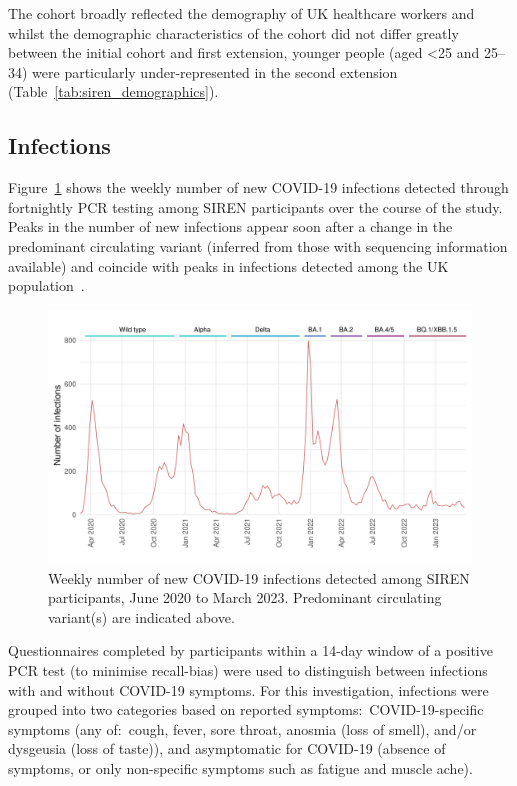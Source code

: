 The cohort broadly reflected the demography of UK healthcare workers and whilst the demographic characteristics of the cohort did not differ greatly between the initial cohort and first extension, younger people (aged <25 and 25--34) were particularly under-represented in the second extension (Table~\ref{tab:siren_demographics}).

\subsection{Infections}

Figure~\ref{fig:sireninfections} shows the weekly number of new COVID-19 infections detected through fortnightly PCR testing among SIREN participants over the course of the study. Peaks in the number of new infections appear soon after a change in the predominant circulating variant (inferred from those with sequencing information available) and coincide with peaks in infections detected among the UK population~\parencite{UK_Government2021-ip}.

\begin{figure}[htbp!]
    \centering
    \includegraphics[width=\textwidth]{infections.pdf}
    \caption[Weekly number of new COVID-19 infections detected among SIREN participants, June 2020 to March 2023]{Weekly number of new COVID-19 infections detected among SIREN participants, June 2020 to March 2023. Predominant circulating variant(s) are indicated above.}\label{fig:sireninfections}
\end{figure}

Questionnaires completed by participants within a 14-day window of a positive PCR test (to minimise recall-bias) were used to distinguish between infections with and without COVID-19 symptoms. For this investigation, infections were grouped into two categories based on reported symptoms:\ COVID-19-specific symptoms (any of:\ cough, fever, sore throat, anosmia (loss of smell), and/or dysgeusia (loss of taste)), and asymptomatic for COVID-19 (absence of symptoms, or only non-specific symptoms such as fatigue and muscle ache).

